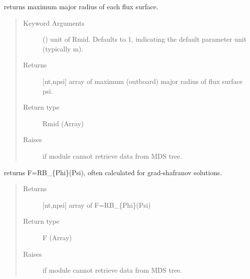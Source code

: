\documentclass[letterpaper,10pt,english]{sphinxmanual}
\begin{document}
\begin{fulllineitems}
\begin{fulllineitems}
\label{\detokenize{eqtools:eqtools.CModEFIT.CModEFITTree.getRmidPsi}}
returns maximum major radius of each flux surface.
\begin{quote}\begin{description}
\item[{Keyword Arguments}] \leavevmode
{} () \textendash{} unit of Rmid.  Defaults to 1, indicating
the default parameter unit (typically m).

\item[{Returns}] \leavevmode
{[}nt,npsi{]} array of maximum (outboard) major radius of
flux surface psi.

\item[{Return type}] \leavevmode
Rmid (Array)

\item[{Raises}] \leavevmode
{} \textendash{} if module cannot retrieve data from MDS tree.

\end{description}\end{quote}

\end{fulllineitems}


\begin{fulllineitems}
\label{\detokenize{eqtools:eqtools.CModEFIT.CModEFITTree.getF}}
returns F=RB\_\{Phi\}(Psi), often calculated for grad-shafranov
solutions.
\begin{quote}\begin{description}
\item[{Returns}] \leavevmode
{[}nt,npsi{]} array of F=RB\_\{Phi\}(Psi)

\item[{Return type}] \leavevmode
F (Array)

\item[{Raises}] \leavevmode
{} \textendash{} if module cannot retrieve data from MDS tree.


\end{description}
\end{quote}
\end{fulllineitems}
\end{fulllineitems}
\end{document}
